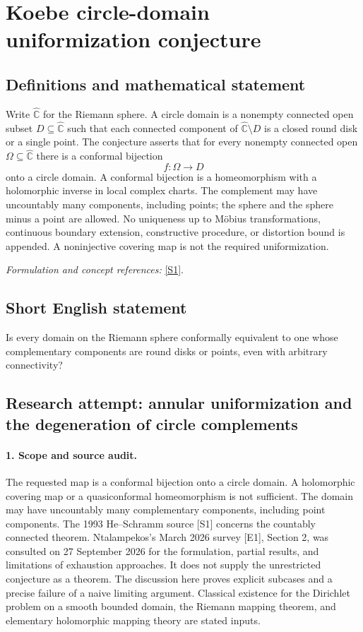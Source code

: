 \documentclass[11pt]{article}
\begin{document}
\section*{\texorpdfstring{Koebe circle-domain uniformization conjecture}{Koebe circle-domain uniformization conjecture}}\label{statement}
\subsection{Definitions and mathematical statement}
Write $\widehat{{\mathbb{C}}}$ for the Riemann sphere. A circle domain is a nonempty connected open subset $D\subseteq\widehat{{\mathbb{C}}}$ such that each connected component of $\widehat{{\mathbb{C}}}\setminus D$ is a closed round disk or a single point. The conjecture asserts that for every nonempty connected open $\Omega\subseteq\widehat{{\mathbb{C}}}$ there is a conformal bijection
\[
 f:\Omega\longrightarrow D
\]
onto a circle domain. A conformal bijection is a homeomorphism with a holomorphic inverse in local complex charts. The complement may have uncountably many components, including points; the sphere and the sphere minus a point are allowed. No uniqueness up to M\"obius transformations, continuous boundary extension, constructive procedure, or distortion bound is appended. A noninjective covering map is not the required uniformization.
\par\smallskip\textit{Formulation and concept references:} \href{https://www.math.stonybrook.edu/~bishop/classes/math536.S24/He_Schramm_1993.pdf}{[S1]}.

\subsection{Short English statement}
Is every domain on the Riemann sphere conformally equivalent to one whose complementary components are round disks or points, even with arbitrary connectivity?
\subsection{Research attempt: annular uniformization and the degeneration of circle complements}
\paragraph{1. Scope and source audit.}
The requested map is a conformal bijection onto a circle domain. A holomorphic covering map or a quasiconformal homeomorphism is not sufficient. The domain may have uncountably many complementary components, including point components. The 1993 He--Schramm source [S1] concerns the countably connected theorem. Ntalampekos's March 2026 survey [E1], Section 2, was consulted on 27 September 2026 for the formulation, partial results, and limitations of exhaustion approaches. It does not supply the unrestricted conjecture as a theorem. The discussion here proves explicit subcases and a precise failure of a naive limiting argument. Classical existence for the Dirichlet problem on a smooth bounded domain, the Riemann mapping theorem, and elementary holomorphic mapping theory are stated inputs.
\end{document}
